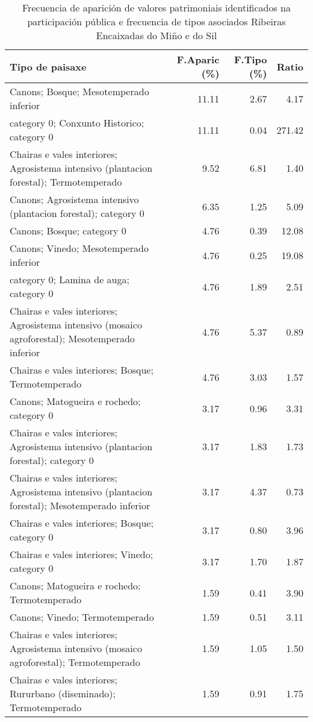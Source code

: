 \begin{table}[p]
\centering
\caption{Frecuencia de aparición de valores patrimoniais identificados na participación pública e frecuencia de tipos asociados Ribeiras Encaixadas do Miño e do Sil} 
\label{vsixotpat4}
\begin{tabular}{lrrr}
  \hline
Tipo de paisaxe & F.Aparic (\%) & F.Tipo (\%) & Ratio \\ 
  \hline
Canons; Bosque; Mesotemperado inferior & 11.11 & 2.67 & 4.17 \\ 
  category 0; Conxunto Historico; category 0 & 11.11 & 0.04 & 271.42 \\ 
  Chairas e vales interiores; Agrosistema intensivo (plantacion forestal); Termotemperado & 9.52 & 6.81 & 1.40 \\ 
  Canons; Agrosistema intensivo (plantacion forestal); category 0 & 6.35 & 1.25 & 5.09 \\ 
  Canons; Bosque; category 0 & 4.76 & 0.39 & 12.08 \\ 
  Canons; Vinedo; Mesotemperado inferior & 4.76 & 0.25 & 19.08 \\ 
  category 0; Lamina de auga; category 0 & 4.76 & 1.89 & 2.51 \\ 
  Chairas e vales interiores; Agrosistema intensivo (mosaico agroforestal); Mesotemperado inferior & 4.76 & 5.37 & 0.89 \\ 
  Chairas e vales interiores; Bosque; Termotemperado & 4.76 & 3.03 & 1.57 \\ 
  Canons; Matogueira e rochedo; category 0 & 3.17 & 0.96 & 3.31 \\ 
  Chairas e vales interiores; Agrosistema intensivo (plantacion forestal); category 0 & 3.17 & 1.83 & 1.73 \\ 
  Chairas e vales interiores; Agrosistema intensivo (plantacion forestal); Mesotemperado inferior & 3.17 & 4.37 & 0.73 \\ 
  Chairas e vales interiores; Bosque; category 0 & 3.17 & 0.80 & 3.96 \\ 
  Chairas e vales interiores; Vinedo; category 0 & 3.17 & 1.70 & 1.87 \\ 
  Canons; Matogueira e rochedo; Termotemperado & 1.59 & 0.41 & 3.90 \\ 
  Canons; Vinedo; Termotemperado & 1.59 & 0.51 & 3.11 \\ 
  Chairas e vales interiores; Agrosistema intensivo (mosaico agroforestal); Termotemperado & 1.59 & 1.05 & 1.50 \\ 
  Chairas e vales interiores; Rururbano (diseminado); Termotemperado & 1.59 & 0.91 & 1.75 \\ 

\end{tabular}
\end{table}
